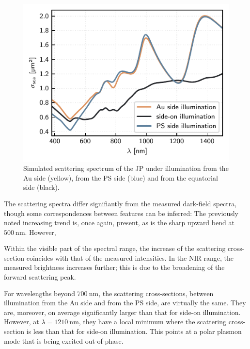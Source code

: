 \documentclass[10pt]{article}
\begin{document}
\begin{figure}[h]
    \centering
    \includegraphics{[fig] spectra (principal).PDF}
    \caption{Simulated scattering spectrum of the JP under illumination from the Au side (yellow), from the PS side (blue) and from the equatorial side (black).}
    \label{fig:spectra-principal}
\end{figure}

The scattering spectra differ signifiantly from the measured dark-field spectra, though some correspondences between features can be inferred: 
The previously noted increasing trend is, once again, present, as is the sharp upward bend at $\SI{500}{\nano\meter}$. 
However, 

Within the visible part of the spectral range, the increase of the scattering cross-section coincides with that of the measured intensities. 
In the NIR range, the measured brightness increases further; this is due to the broadening of the forward scattering peak. 

For wavelengths beyond $\SI{700}{\nano\meter}$, the scattering cross-sections, between illumination from the Au side and from the PS side, are virtually the same. 
They are, moreover, on average significantly larger than that for side-on illumination. 
However, at $\lambda=\SI{1210}{\nano\meter}$, they have a local minimum where the scattering cross-section is less than that for side-on illumination. 
This points at a polar plasmon mode that is being excited out-of-phase. 
\end{document}
